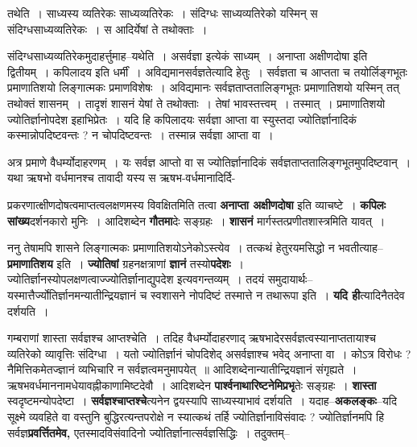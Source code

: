 \documentclass[article,12pt,a4paper]{memoir}
\begin{document}
	  \endgroup
	 

	  \pstart तथेति । साध्यस्य व्यतिरेकः साध्यव्यतिरेकः । संदिग्धः साध्यव्यतिरेको यस्मिन् स संदिग्धसाध्यव्यतिरेकः । स आदिर्येषां ते तथोक्ताः ।
	\pend
        

	  \pstart संदिग्धसाध्यव्यतिरेकमुदाहर्त्तुमाह--यथेति । असर्वज्ञा इत्येकं साध्यम् । अनाप्ता अक्षीणदोषा इति द्वितीयम् । कपिलादय इति धर्मीं । अविद्यमानसर्वज्ञतेत्यादि हेतुः । सर्वज्ञता च आप्तता च तयोर्लिङ्गभूतः प्रमाणातिशयो लिङ्गात्मकः प्रमाणविशेषः । अविद्यमानः सर्वज्ञताप्ततालिङ्गभूतः प्रमाणातिशयो यस्मिन् तत् तथोक्तं शासनम् । तादृशं शासनं येषां ते तथोक्ताः । तेषां भावस्तत्त्वम् । तस्मात् । प्रमाणातिशयो ज्योतिर्ज्ञानोपदेश इहाभिप्रेतः । यदि हि कपिलादयः सर्वज्ञा आप्ता वा स्युस्तदा ज्योतिर्ज्ञानादिकं कस्मान्नोपदिष्टवन्तः ? न चोपदिष्टवन्तः । तस्मान्न सर्वज्ञा आप्ता वा ।
	\pend
        

	  \pstart अत्र प्रमाणे वैधर्म्योदाहरणम् । यः सर्वज्ञ आप्तो वा स ज्योतिर्ज्ञानादिकं सर्वज्ञताप्ततालिङ्गभूतमुपदिष्टवान् । यथा ऋषभो वर्धमानश्च तावादी यस्य स ऋषभ-वर्धमानादिर्दि-
	\pend
      
	  \endgroup
	

	  \pstart प्रकरणात्क्षीणदोषत्वमाप्तत्वलक्षणमस्य विवक्षितमिति तत्वा \textbf{अनाप्ता अक्षीणदोषा} इति व्याचष्टे । \textbf{कपिलः सांख्य}दर्शनकारो मुनिः । आदिशब्देन \textbf{गौतमा}देः सङ्ग्रहः । \textbf{शासनं} मार्गस्तत्प्रणीतशास्त्रमिति यावत् ।
	\pend
      

	  \pstart ननु तेषामपि शासने लिङ्गात्मकः प्रमाणातिशयोऽनेकोऽस्त्येव । तत्कथं हेतुरयमसिद्धो न भवतीत्याह--\textbf{प्रमाणातिशय} इति । \textbf{ज्योतिषां} ग्रहनक्षत्राणां \textbf{ज्ञानं} तस्यो\textbf{पदेशः} । ज्योतिर्ज्ञानस्योपलक्षणत्वाज्ज्योतिर्ज्ञानाद्युपदेश इत्यवगन्तव्यम् । तदयं समुदायार्थः--यस्मात्तैर्ज्योतिर्ज्ञानमन्यातीन्द्रियज्ञानं च स्वशासने नोपदिष्टं तस्मात्ते न तथारूपा इति । \textbf{यदि ही}त्यादिनैतदेव दर्शयति ।  \leavevmode{} 
	  
	गम्बराणां शास्ता सर्वज्ञश्च आप्तश्चेति । तदिह वैधर्म्योदाहरणाद् ऋषभादेरसर्वज्ञत्वस्यानाप्ततायाश्च व्यतिरेको व्यावृत्तिः संदिग्धा । यतो ज्योतिर्ज्ञानं चोपदिशेद् असर्वज्ञाश्च भवेद् अनाप्ता वा । कोऽत्र विरोधः ? नैमित्तिकमेतज्ज्ञानं व्यभिचारि न सर्वज्ञत्वमनुमापयेत् ॥ आदिशब्देनान्यातीन्द्रियज्ञानं संगृह्यते । ऋषभवर्धमाननामधेयावह्नीकाणामिष्टदेवौ । आदिशब्देन \textbf{पार्श्वनाथारिष्टनेमिप्रभृ}तेः सङ्ग्रहः । \textbf{शास्ता} स्वदृष्टमन्योपदेष्टा । \textbf{सर्वज्ञश्चाप्तश्चे}त्यनेन द्वयस्यापि साध्यस्याभावं दर्शयति । यदाह--\textbf{अकलङ्कः}--यदि सूक्ष्मे व्यवहिते वा वस्तुनि बुद्धिरत्यन्तपरोक्षे न स्यात्कथं तर्हि ज्योतिर्ज्ञानाविसंवादः ? ज्योतिर्ज्ञानमपि हि सर्वज्ञ\textbf{प्रवर्त्तितमेव,} एतस्मादविसंवादिनो ज्योतिर्ज्ञानात्सर्वज्ञसिद्धिः । तदुक्तम्--
	\pend
      
\end{document}
